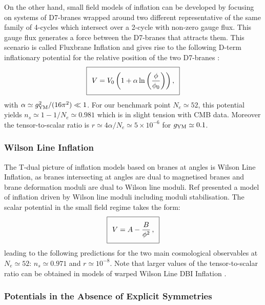 On the other hand, small field models of inflation can be developed by focusing on systems of D7-branes wrapped around two different representative of the same family of 4-cycles which intersect over a 2-cycle with non-zero gauge flux. This gauge flux generates a force between the D7-branes that attracts them. This scenario is called Fluxbrane Inflation and gives rise to the following D-term inflationary potential for the relative position of the two D7-branes \cite{Hebecker:2011hk,Hebecker:2012aw,Arends:2014qca}:
\begin{equation}
\setlength\fboxsep{0.25cm}
\setlength\fboxrule{0.4pt}
\boxed{
V = V_0\left(1+\alpha\ln\left(\frac{\phi}{\phi_0}\right)\right),    
}
\end{equation}
with $\alpha\simeq g_{\rm YM}^2/(16\pi^2)\ll 1$. For our benchmark point $N_e\simeq 52$, this potential yields $n_s\simeq 1-1/N_e\simeq 0.981$ which is in slight tension with CMB data. Moreover the tensor-to-scalar ratio is $r\simeq 4\alpha/N_e \simeq 5\times 10^{-6}$ for $g_{\rm YM}\simeq 0.1$. 


\subsubsection*{Wilson Line Inflation}

The T-dual picture of inflation models based on branes at angles \cite{Garcia-Bellido:2001lbk,Blumenhagen:2002ua,Gomez-Reino:2002yja} is Wilson Line Inflation, as branes intersecting at angles are dual to magnetised branes and brane deformation moduli are dual to Wilson line moduli. Ref \cite{Avgoustidis:2006zp} presented a model of inflation driven by Wilson line moduli including moduli stabilisation. The scalar potential in the small field regime takes the form:
\begin{equation}
\setlength\fboxsep{0.25cm}
\setlength\fboxrule{0.4pt}
\boxed{
V = A- \frac{B}{\phi^2}\,,
}
\end{equation}
leading to the following predictions for the two main cosmological observables at $N_e\simeq 52$: $n_s\simeq 0.971$ and $r\simeq 10^{-8}$. Note that larger values of the tensor-to-scalar ratio can be obtained in models of warped Wilson Line DBI Inflation \cite{Avgoustidis:2008zu,Kooner:2015rza}.

\subsubsection{Potentials in the Absence of Explicit Symmetries}

